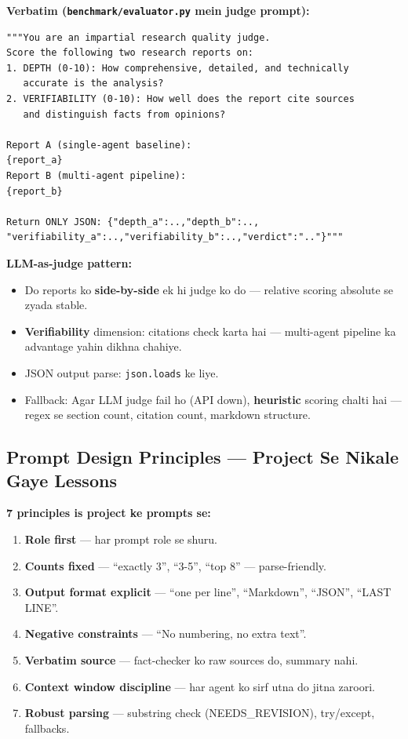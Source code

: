 \begin{codestorybox}
\textbf{Verbatim (\texttt{benchmark/evaluator.py} mein judge prompt):}

\begin{lstlisting}[style=pythonstyle, caption={LLM-as-judge scoring}]
"""You are an impartial research quality judge.
Score the following two research reports on:
1. DEPTH (0-10): How comprehensive, detailed, and technically
   accurate is the analysis?
2. VERIFIABILITY (0-10): How well does the report cite sources
   and distinguish facts from opinions?

Report A (single-agent baseline):
{report_a}
Report B (multi-agent pipeline):
{report_b}

Return ONLY JSON: {"depth_a":..,"depth_b":..,
"verifiability_a":..,"verifiability_b":..,"verdict":".."}"""
\end{lstlisting}

\textbf{LLM-as-judge pattern:}
\begin{itemize}
\item Do reports ko \textbf{side-by-side} ek hi judge ko do --- relative scoring absolute se zyada stable.
\item \textbf{Verifiability} dimension: citations check karta hai --- multi-agent pipeline ka advantage yahin dikhna chahiye.
\item JSON output parse: \texttt{json.loads} ke liye.
\item Fallback: Agar LLM judge fail ho (API down), \textbf{heuristic} scoring chalti hai --- regex se section count, citation count, markdown structure.
\end{itemize}
\end{codestorybox}

\subsection{Prompt Design Principles --- Project Se Nikale Gaye Lessons}

\begin{conceptbox}
\textbf{7 principles is project ke prompts se:}
\begin{enumerate}[label=\arabic*.]
\item \textbf{Role first} --- har prompt role se shuru.
\item \textbf{Counts fixed} --- ``exactly 3'', ``3-5'', ``top 8'' --- parse-friendly.
\item \textbf{Output format explicit} --- ``one per line'', ``Markdown'', ``JSON'', ``LAST LINE''.
\item \textbf{Negative constraints} --- ``No numbering, no extra text''.
\item \textbf{Verbatim source} --- fact-checker ko raw sources do, summary nahi.
\item \textbf{Context window discipline} --- har agent ko sirf utna do jitna zaroori.
\item \textbf{Robust parsing} --- substring check (NEEDS\_REVISION), try/except, fallbacks.
\end{enumerate}
\end{conceptbox}


